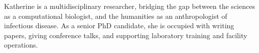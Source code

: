 
\begin{cvparagraph}


Katherine is a multidisciplinary researcher, bridging the gap between the sciences as a computational biologist, and the humanities as an anthropologist of infectious disease. As a senior PhD candidate, she is occupied with writing papers, giving conference talks, and supporting laboratory training and facility operations.

\end{cvparagraph}

